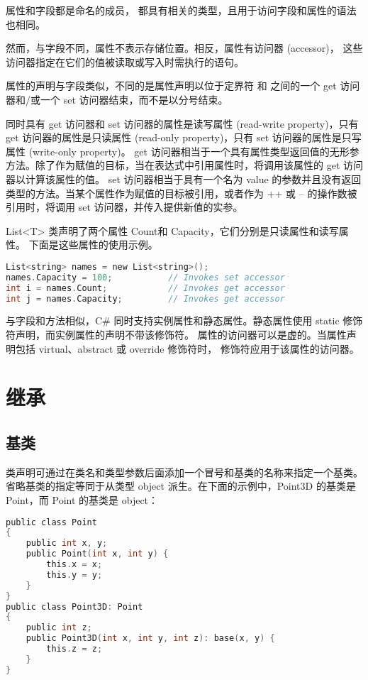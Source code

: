 属性和字段都是命名的成员，
都具有相关的类型，且用于访问字段和属性的语法也相同。

然而，与字段不同，属性不表示存储位置。相反，属性有访问器 (accessor)，
这些访问器指定在它们的值被读取或写入时需执行的语句。

属性的声明与字段类似，不同的是属性声明以位于定界符 { 和 } 之间的一个 get 访问器和/或一个 set 访问器结束，而不是以分号结束。

同时具有 get 访问器和 set 访问器的属性是读写属性 (read-write property)，只有 get 访问器的属性是只读属性 (read-only property)，只有 set 访问器的属性是只写属性 (write-only property)。
get 访问器相当于一个具有属性类型返回值的无形参方法。除了作为赋值的目标，当在表达式中引用属性时，将调用该属性的 get 访问器以计算该属性的值。
set 访问器相当于具有一个名为 value 的参数并且没有返回类型的方法。当某个属性作为赋值的目标被引用，或者作为 ++ 或 -- 的操作数被引用时，将调用 set 访问器，并传入提供新值的实参。

List<T> 类声明了两个属性 Count和 Capacity，它们分别是只读属性和读写属性。
下面是这些属性的使用示例。

 \begin{lstlisting}[language=C]
List<string> names = new List<string>();
names.Capacity = 100;           // Invokes set accessor
int i = names.Count;            // Invokes get accessor
int j = names.Capacity;         // Invokes get accessor
 \end{lstlisting}

与字段和方法相似，C\# 同时支持实例属性和静态属性。静态属性使用 static 修饰符声明，而实例属性的声明不带该修饰符。
属性的访问器可以是虚的。当属性声明包括 virtual、abstract 或 override 修饰符时，
修饰符应用于该属性的访问器。

\section{继承}


 
\subsection{基类}

类声明可通过在类名和类型参数后面添加一个冒号和基类的名称来指定一个基类。
省略基类的指定等同于从类型 object 派生。在下面的示例中，Point3D 的基类是 Point，而 Point 的基类是 object：

 \begin{lstlisting}[language=C] 
public class Point
{
    public int x, y;
    public Point(int x, int y) {
        this.x = x;
        this.y = y;
    }
}
public class Point3D: Point
{
    public int z;
    public Point3D(int x, int y, int z): base(x, y) {
        this.z = z;
    }
}
 \end{lstlisting}


